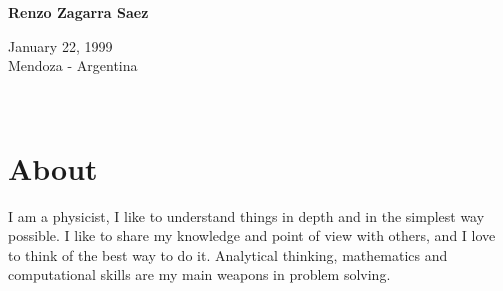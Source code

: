 \documentclass[a4paper,10pt]{article}
\begin{document}
\thispagestyle{empty}

\begin{adjustbox}{valign=t}
\begin{minipage}{0.44\textwidth} %
\begin{center}

\MySkip %

{\LARGE \bfseries Renzo Zagarra Saez}

\MySkip %

January 22, 1999\\
Mendoza - Argentina\\

\MySkip %

\textcolor{ColorThree}{\faEnvelopeO} 
 \\

\textcolor{ColorThree}{\faGithub} 

\textcolor{ColorThree}{\faLinkedin}

\end{center}


\section*{About}

I am a physicist, I like to understand things in depth and in the simplest way possible.
I like to share my knowledge and point of view with others, 
and I love to think of the best way to do it. Analytical thinking, mathematics 
and computational skills are my main weapons in problem solving.



\end{minipage}
\end{adjustbox}
\end{document}
